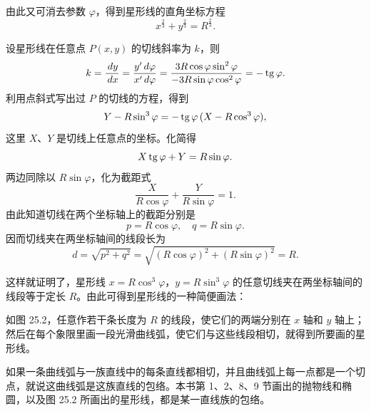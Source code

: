 由此又可消去参数 $\varphi$，得到星形线的直角坐标方程
\[
  x^{\frac{2}{3}} + y^{\frac{2}{3}} = R^{\frac{2}{3}}.
\]

设星形线在任意点 $P(x, y)$ 的切线斜率为 $k$，则
\[
  k = \frac{\,d y}{\,d x} = \frac{y'\,d\varphi}{x'\,d\varphi} = \frac{3R\cos\varphi\sin^2\varphi}{-3R\sin\varphi\cos^2\varphi} = -\operatorname{tg}\varphi.
\]
利用点斜式写出过 $P$ 的切线的方程，得到
\[
  Y - R\sin^3\varphi = -\operatorname{tg}\varphi\,(X - R\cos^3\varphi),
\]
这里 $X$、$Y$ 是切线上任意点的坐标。化简得
\[
  X\operatorname{tg}\varphi + Y = R\sin\varphi.
\]
两边同除以 $R\sin\varphi$，化为截距式
\[
  \frac{X}{R\cos\varphi} + \frac{Y}{R\sin\varphi} = 1.
\]
由此知道切线在两个坐标轴上的截距分别是
\[
  p = R\cos\varphi,\quad q = R\sin\varphi.
\]
因而切线夹在两坐标轴间的线段长为
\[
  d = \sqrt{p^2+q^2} = \sqrt{(R\cos\varphi)^2 + (R\sin\varphi)^2} = R.
\]

这样就证明了，星形线 $x=R\cos^3\varphi$，$y=R\sin^3\varphi$ 的任意切线夹在两坐标轴间的线段等于定长 $R$。由此可得到星形线的一种简便画法：

\noindent
\begin{minipage}[c]{0.42\textwidth}
  \centering
\end{minipage}
\hfill
\begin{minipage}[c]{0.55\textwidth}
  \setlength{\parindent}{2em}\indent
  如图 25.2，任意作若干条长度为 $R$ 的线段，使它们的两端分别在 $x$ 轴和 $y$ 轴上；然后在每个象限里画一段光滑曲线弧，使它们与这些线段相切，就得到所要画的星形线。

  如果一条曲线弧与一族直线中的每条直线都相切，并且曲线弧上每一点都是一个切点，就说这曲线弧是这族直线的包络。本书第 1、2、8、9 节画出的抛物线和椭圆，以及图 25.2 所画出的星形线，都是某一直线族的包络。
\end{minipage}
